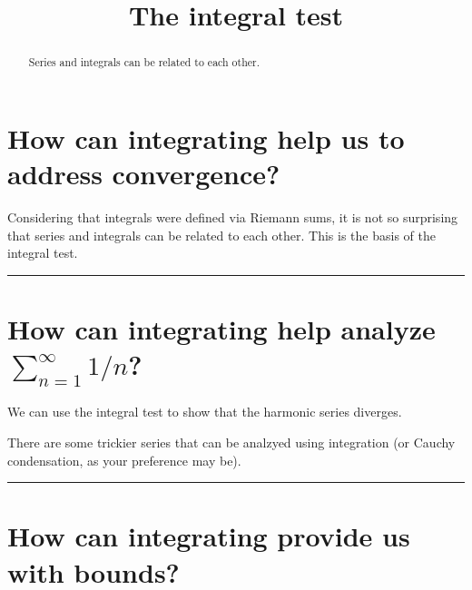 \documentclass{ximera}
\title{The integral test}
\begin{document}
\begin{abstract}
  Series and integrals can be related to each other. 
\end{abstract}

\maketitle

\section{How can integrating help us to address convergence?}

Considering that integrals were defined via Riemann sums, it is not so surprising that series and integrals can be related to each other.  This is the basis of the integral test.


\hrule

\section{How can integrating help analyze $\displaystyle\sum_{n=1}^\infty 1/n$?}

We can use the integral test to show that the harmonic series diverges.


There are some trickier series that can be analzyed using integration (or Cauchy condensation, as your preference may be).


\hrule

\section{How can integrating provide us with bounds?}
\end{document}
